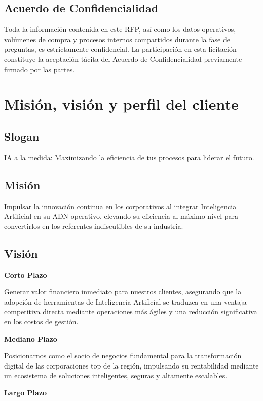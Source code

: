 \documentclass[12pt]{article}
\begin{document}
\subsection{Acuerdo de Confidencialidad}
Toda la información contenida en este RFP, así como los datos operativos, volúmenes
de compra y procesos internos compartidos durante la fase de preguntas, es
estrictamente confidencial. La participación en esta licitación constituye la aceptación
tácita del Acuerdo de Confidencialidad previamente firmado por las partes.


\section{Misión, visión y perfil del cliente}

\subsection{Slogan}
IA a la medida: Maximizando la eficiencia de tus procesos para liderar el futuro.

\subsection{Misión}
Impulsar la innovación continua en los corporativos al integrar Inteligencia Artificial en su ADN operativo, elevando su eficiencia al máximo nivel para convertirlos en los referentes indiscutibles de su industria.

\subsection{Visión}

\textbf{Corto Plazo}

Generar valor financiero inmediato para nuestros clientes, asegurando que la adopción de herramientas de Inteligencia Artificial se traduzca en una ventaja competitiva directa mediante operaciones más ágiles y una reducción significativa en los costos de gestión.

\textbf{Mediano Plazo}

Posicionarnos como el socio de negocios fundamental para la transformación digital de las corporaciones top de la región, impulsando su rentabilidad mediante un ecosistema de soluciones inteligentes, seguras y altamente escalables.

\textbf{Largo Plazo}
\end{document}
